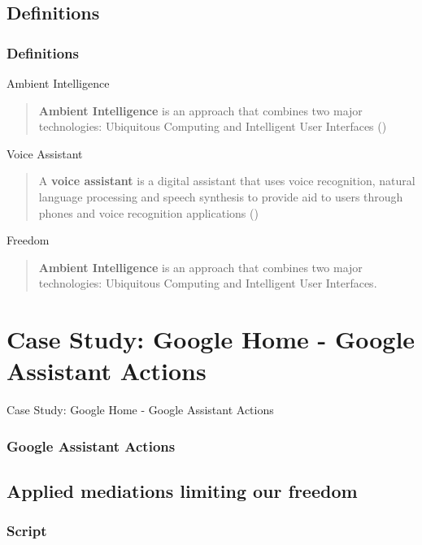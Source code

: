 \documentclass{beamer}
\begin{document}
\subsection{Definitions}
\begin{frame}
\frametitle{Definitions}
{\small 	\begin{block}{Ambient Intelligence}
		\begin{quote}
			\textbf{Ambient Intelligence} is an approach that combines two major technologies: Ubiquitous Computing and Intelligent User Interfaces (\cite{brey2005freedom})
		\end{quote}
	\end{block}

	\begin{block}{Voice Assistant}
		\begin{quote}
			A \textbf{voice assistant} is a digital assistant that uses voice recognition, natural language processing and speech synthesis to provide aid to users through phones and voice recognition applications (\cite{whatis})
		\end{quote}
	\end{block}

	\begin{block}{Freedom}
		\begin{quote}
			\textbf{Ambient Intelligence} is an approach that combines two major technologies: Ubiquitous Computing and Intelligent User Interfaces. 
		\end{quote}
	\end{block}}
\end{frame}

\section{Case Study: Google Home - Google Assistant Actions}

\begin{frame}
\begin{center} 
	 Case Study: Google Home - Google Assistant Actions
\end{center}
\end{frame}

\begin{frame}
\frametitle{Google Assistant Actions}
\end{frame}

\subsection{Applied mediations limiting our freedom}
\begin{frame}
\frametitle{Script}
\end{frame}
\end{document}
